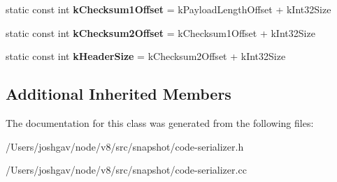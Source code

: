 \begin{DoxyCompactItemize}
\item 
static const int {\bfseries k\+Checksum1\+Offset} = k\+Payload\+Length\+Offset + k\+Int32\+Size\hypertarget{classv8_1_1internal_1_1_serialized_code_data_abdc63808e5ea77f4d5d3be0b4146abde}{}\label{classv8_1_1internal_1_1_serialized_code_data_abdc63808e5ea77f4d5d3be0b4146abde}

\item 
static const int {\bfseries k\+Checksum2\+Offset} = k\+Checksum1\+Offset + k\+Int32\+Size\hypertarget{classv8_1_1internal_1_1_serialized_code_data_aa2bc822d601fe94558b3b18816e74a42}{}\label{classv8_1_1internal_1_1_serialized_code_data_aa2bc822d601fe94558b3b18816e74a42}

\item 
static const int {\bfseries k\+Header\+Size} = k\+Checksum2\+Offset + k\+Int32\+Size\hypertarget{classv8_1_1internal_1_1_serialized_code_data_ae1a493f9b7178ab296a6afdcd21eab1f}{}\label{classv8_1_1internal_1_1_serialized_code_data_ae1a493f9b7178ab296a6afdcd21eab1f}

\end{DoxyCompactItemize}
\subsection*{Additional Inherited Members}


The documentation for this class was generated from the following files\+:\begin{DoxyCompactItemize}
\item 
/\+Users/joshgav/node/v8/src/snapshot/code-\/serializer.\+h\item 
/\+Users/joshgav/node/v8/src/snapshot/code-\/serializer.\+cc\end{DoxyCompactItemize}
